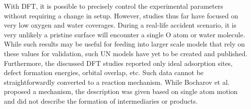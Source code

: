 \documentclass[11pt]{article}
\begin{document}
\begin{multicols}{2}
\par With DFT, it is possible to precisely control the experimental parameters without requiring a change in setup. However, studies thus far have focused on very low oxygen and water coverages. During a real-life accident scenario, it is very unlikely a pristine surface will encounter a single O atom or water molecule. While such results may be useful for feeding into larger scale models that rely on these values for validation, such UN models have yet to be created and published. Furthermore, the discussed DFT studies reported only ideal adsorption sites, defect formation energies, orbital overlap, etc. Such data cannot be straightforwardly converted to a reaction mechanism. While Bocharov et al. \cite{Bocharov2013} proposed a mechanism, the description was given based on single atom motion and did not describe the formation of intermediaries or products.


\end{multicols}
\end{document}
